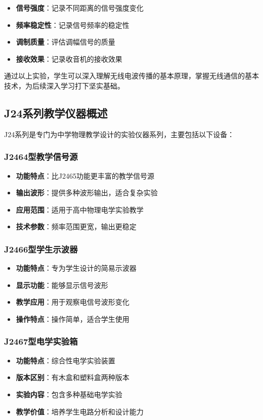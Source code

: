 \documentclass[12pt,UTF8]{ctexbook}
\begin{document}
\begin{itemize}[leftmargin=2cm]
	\item \textbf{信号强度}：记录不同距离的信号强度变化
	\item \textbf{频率稳定性}：记录信号频率的稳定性
	\item \textbf{调制质量}：评估调幅信号的质量
	\item \textbf{接收效果}：记录收音机的接收效果
\end{itemize}

通过以上实验，学生可以深入理解无线电波传播的基本原理，掌握无线通信的基本技术，为后续深入学习打下坚实基础。

\subsection{J24系列教学仪器概述}
J24系列是专门为中学物理教学设计的实验仪器系列，主要包括以下设备：

\subsubsection{J2464型教学信号源}
\begin{itemize}[leftmargin=2cm]
	\item \textbf{功能特点}：比J2465功能更丰富的教学信号源
	\item \textbf{输出波形}：提供多种波形输出，适合复杂实验
	\item \textbf{应用范围}：适用于高中物理电学实验教学
	\item \textbf{技术参数}：频率范围更宽，输出更稳定
\end{itemize}

\subsubsection{J2466型学生示波器}
\begin{itemize}[leftmargin=2cm]
	\item \textbf{功能特点}：专为学生设计的简易示波器
	\item \textbf{显示功能}：能够显示信号波形
	\item \textbf{教学应用}：用于观察电信号波形变化
	\item \textbf{操作特点}：操作简单，适合学生使用
\end{itemize}

\subsubsection{J2467型电学实验箱}
\begin{itemize}[leftmargin=2cm]
	\item \textbf{功能特点}：综合性电学实验装置
	\item \textbf{版本区别}：有木盒和塑料盒两种版本
	\item \textbf{实验内容}：包含多种基础电学实验
	\item \textbf{教学价值}：培养学生电路分析和设计能力
\end{itemize}
\end{document}
